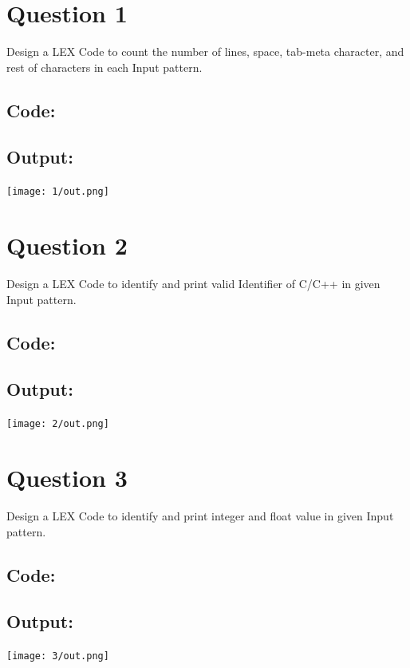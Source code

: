 \documentclass{article}
\begin{document}
\newpage
\section*{Question 1}
Design a LEX Code to count the number of lines, space,
tab-meta character, and rest of characters in each Input
pattern.
\subsection*{Code:}

\newpage
\subsection*{Output:}
% 
\begin{center}
  \texttt{[image: 1/out.png]}
\end{center}

\newpage
\section*{Question 2}
Design a LEX Code to identify and print valid Identifier of
C/C++ in given Input pattern.
\subsection*{Code:}

\newpage
\subsection*{Output:}
% 
\begin{center}
  \texttt{[image: 2/out.png]}
\end{center}

\newpage
\section*{Question 3}
Design a LEX Code to identify and print integer and float
value in given Input pattern.
\subsection*{Code:}

\newpage
\subsection*{Output:}
% 
\begin{center}
  \texttt{[image: 3/out.png]}
\end{center}
\end{document}
